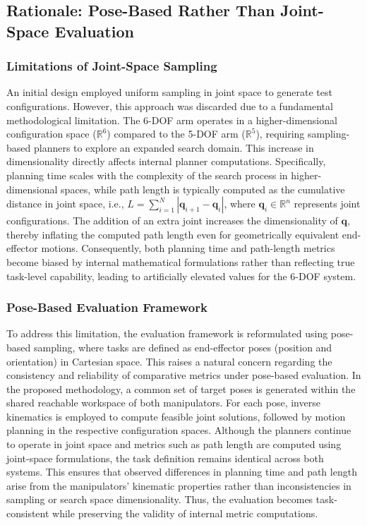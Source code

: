 \documentclass[conference]{IEEEtran}
\begin{document}
	\subsection{Rationale: Pose-Based Rather Than Joint-Space Evaluation}
	
	\subsubsection{Limitations of Joint-Space Sampling}
	An initial design employed uniform sampling in joint space to generate test configurations. However, this approach was discarded due to a fundamental methodological limitation. The 6-DOF arm operates in a higher-dimensional configuration space ($\mathbb{R}^6$) compared to the 5-DOF arm ($\mathbb{R}^5$), requiring sampling-based planners to explore an expanded search domain. This increase in dimensionality directly affects internal planner computations. Specifically, planning time scales with the complexity of the search process in higher-dimensional spaces, while path length is typically computed as the cumulative distance in joint space, i.e., $L = \sum_{i=1}^{N} |\mathbf{q}_{i+1} - \mathbf{q}_i|$, where $\mathbf{q}_i \in \mathbb{R}^n$ represents joint configurations. The addition of an extra joint increases the dimensionality of $\mathbf{q}$, thereby inflating the computed path length even for geometrically equivalent end-effector motions. Consequently, both planning time and path-length metrics become biased by internal mathematical formulations rather than reflecting true task-level capability, leading to artificially elevated values for the 6-DOF system.
	
	\subsubsection{Pose-Based Evaluation Framework}
	To address this limitation, the evaluation framework is reformulated using pose-based sampling, where tasks are defined as end-effector poses (position and orientation) in Cartesian space. This raises a natural concern regarding the consistency and reliability of comparative metrics under pose-based evaluation. In the proposed methodology, a common set of target poses is generated within the shared reachable workspace of both manipulators. For each pose, inverse kinematics is employed to compute feasible joint solutions, followed by motion planning in the respective configuration spaces. Although the planners continue to operate in joint space and metrics such as path length are computed using joint-space formulations, the task definition remains identical across both systems. This ensures that observed differences in planning time and path length arise from the manipulators’ kinematic properties rather than inconsistencies in sampling or search space dimensionality. Thus, the evaluation becomes task-consistent while preserving the validity of internal metric computations.
	
\end{document}
